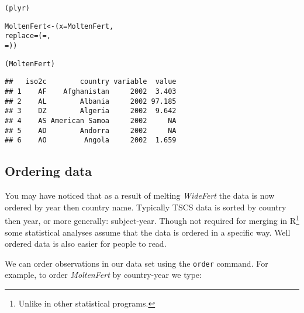 \begin{knitrout}
\color{fgcolor}\begin{kframe}
\begin{alltt}
(plyr)

MoltenFert <- (x = MoltenFert,
                     replace = ( = ,
                                  = ))
\end{alltt}


{\ttfamily\noindent\color{warningcolor}{\#\# Warning: unused name(s) selected}}\begin{alltt}

(MoltenFert)
\end{alltt}
\begin{verbatim}
##   iso2c        country variable  value
## 1    AF    Afghanistan     2002  3.403
## 2    AL        Albania     2002 97.185
## 3    DZ        Algeria     2002  9.642
## 4    AS American Samoa     2002     NA
## 5    AD        Andorra     2002     NA
## 6    AO         Angola     2002  1.659
\end{verbatim}
\end{kframe}
\end{knitrout}


\subsection{Ordering data}

You may have noticed that as a result of melting \emph{WideFert} the data is now ordered by year then country name. Typically TSCS data is sorted by country then year, or more generally: subject-year. Though not required for merging in R\footnote{Unlike in other statistical programs.} some statistical analyses assume that the data is ordered in a specific way. Well ordered data is also easier for people to read.

We can order observations in our data set using the \texttt{order} command. For example, to order \emph{MoltenFert} by country-year we type:

